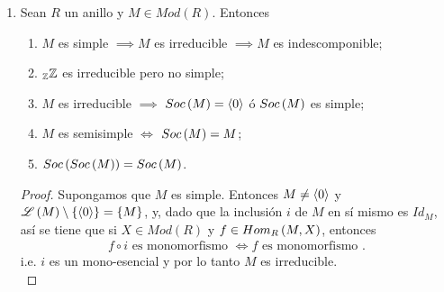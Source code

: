 \documentclass{article}
\begin{document}
\begin{enumerate}[label=\textbf{Ej \arabic*.}]
\begin{proof}
		\end{proof}
		
		\item Sean $R$ un anillo y $M\in Mod(R)$. Entonces
		\begin{enumerate}
			\item $M$ es simple $\implies M$ es irreducible $\implies M$ es indescomponible;
			\item $\mathbb{\ringmod{\mathbb{Z}}{\mathbb{Z}}{l}}$ es irreducible pero no simple;
			\item $M$ es irreducible $\implies$ $Soc\left(M\right)=\left< 0\right>$ ó $Soc\left(M\right)$ es simple;
			\item $M$ es semisimple $\iff$ $Soc\left(M\right)=M$;
			\item $Soc\left(Soc\left(M\right)\right)=Soc\left(M\right)$.
		\end{enumerate}
		\begin{proof}
			 Supongamos que $M$ es simple. Entonces $M\neq\left< 0\right>$ y $\mathscr{L}\left(M\right)\setminus\left\{\left< 0\right>\right\}=\left\{M\right\}$, y, dado que la inclusión $i$ de $M$ en sí mismo es $Id_M$, así se tiene que si $X\in Mod(R)$ y $f\in\functhom{M}{X}{R}$, entonces
			\begin{align*}
				f\circ i\text{ es monomorfismo } \iff				f\text{ es monomorfismo }.
			\end{align*}
			i.e. $i$ es un mono-esencial y por lo tanto $M$ es irreducible.\\
			

\end{proof}
\end{enumerate}
\end{document}
